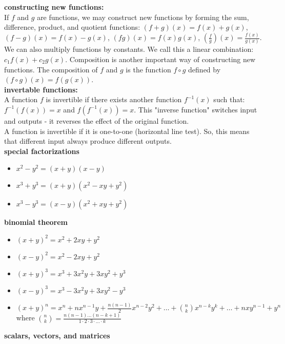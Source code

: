 \documentclass{article}
\begin{document}
\textbf{constructing new functions:}\\
If $f$ and $g$ are functions, we may construct new functions by forming the sum, difference, product, and quotient functions: $(f + g)(x) = f(x) + g(x)$, $(f - g)(x) = f(x) - g(x)$, $(fg)(x) = f(x)g(x)$, $(\frac{f}{g})(x) = \frac{f(x)}{g(x)}$. We can also multiply functions by constants. We call this a linear combination: $c_1f(x) + c_2g(x)$. Composition is another important way of constructing new functions. The composition of $f$ and $g$ is the function $f \circ g$ defined by $(f \circ g)(x) = f(g(x))$.\\

\textbf{invertable functions:}\\
A function $f$ is invertible if there exists another function $f^{-1}(x)$ such that: $f^{-1}(f(x)) = x$ and $f(f^{-1}(x)) = x$. This "inverse function" switches input and outputs - it reverses the effect of the original function.\\

A function is invertible if it is one-to-one (horizontal line test). So, this means that different input always produce different outputs.\\

\textbf{special factorizations}
	\begin{itemize}
		\item $x^2 - y^2 = (x + y)(x - y)$
		\item $x^3 + y^3 = (x + y)(x^2 - xy + y^2)$
		\item $x^3 - y^3 = (x - y)(x^2 + xy + y^2)$
	\end{itemize}

\textbf{binomial theorem}
	\begin{itemize}
		\item $(x + y)^2 = x^2 + 2xy + y^2$
		\item $(x - y)^2 = x^2 - 2xy + y^2$
		\item $(x + y)^3 = x^3 + 3x^2y + 3xy^2 + y^3$
		\item $(x - y)^3 = x^3 - 3x^2y + 3xy^2 - y^3$
		\item $(x + y)^n = x^n + nx^{n-1}y + \frac{n(n-1)}{2}x^{n-2}y^2 + \ldots + \binom{n}{k}x^{n-k}y^k + \ldots + nxy^{n-1} + y^n$ where $\binom{n}{k} = \frac{n(n-1) \ldots (n-k+1)}{1 \cdot 2 \cdot 3 \cdot \ldots \cdot k}$
	\end{itemize}

\textbf{scalars, vectors, and matrices}\\
\end{document}
